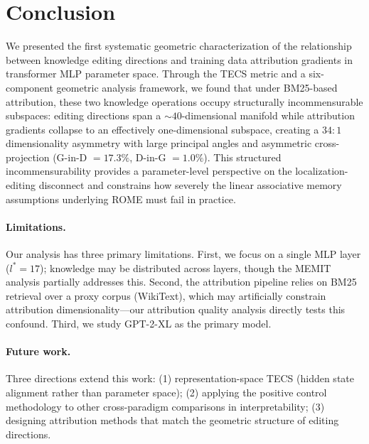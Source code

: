 \section{Conclusion}
\label{sec:conclusion}

We presented the first systematic geometric characterization of the relationship between knowledge editing directions and training data attribution gradients in transformer MLP parameter space.
Through the TECS metric and a six-component geometric analysis framework, we found that under BM25-based attribution, these two knowledge operations occupy structurally incommensurable subspaces: editing directions span a ${\sim}40$-dimensional manifold while attribution gradients collapse to an effectively one-dimensional subspace, creating a $34{:}1$ dimensionality asymmetry with large principal angles and asymmetric cross-projection (G-in-D $= 17.3\%$, D-in-G $= 1.0\%$).
This structured incommensurability provides a parameter-level perspective on the localization-editing disconnect \citep{hase2023does} and constrains how severely the linear associative memory assumptions underlying ROME must fail in practice.

\paragraph{Limitations.}
Our analysis has three primary limitations.
First, we focus on a single MLP layer ($l^* = 17$); knowledge may be distributed across layers, though the MEMIT analysis partially addresses this.
Second, the attribution pipeline relies on BM25 retrieval over a proxy corpus (WikiText), which may artificially constrain attribution dimensionality---our attribution quality analysis directly tests this confound.
Third, we study GPT-2-XL as the primary model.

\paragraph{Future work.}
Three directions extend this work: (1) representation-space TECS (hidden state alignment rather than parameter space); (2) applying the positive control methodology to other cross-paradigm comparisons in interpretability; (3) designing attribution methods that match the geometric structure of editing directions.
